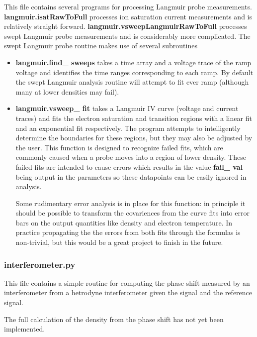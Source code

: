 \documentclass[12pt]{article}
\newcommand{\loc}[1]{{\bf \fontfamily{pcr}\selectfont #1}}
\newcommand{\todo}[1]{ \begin{tcolorbox} \centering  #1 \end{tcolorbox}}
\begin{document}
This file contains several programs for processing Langmuir probe measurements. \loc{langmuir.isatRawToFull} processes ion saturation current measurements and is relatively straight forward. \loc{langmuir.vsweepLangmuirRawToFull} processes swept Langmuir probe measurements and is considerably more complicated. The swept Langmuir probe routine makes use of several subroutines

\begin{itemize}

\item \loc{langmuir.find\_ sweeps} takes a time array and a voltage trace of the ramp voltage and identifies the time ranges corresponding to each ramp. By default the swept Langmuir analysis routine will attempt to fit ever ramp (although many at lower densities may fail). 

\item \loc{langmuir.vsweep\_ fit} takes a Langmuir IV curve (voltage and current traces) and fits the electron saturation and transition regions with a linear fit and an exponential fit respectively. The program attempts to intelligently determine the boundaries for these regions, but they may also be adjusted by the user. This function is designed to recognize failed fits, which are commonly caused when a probe moves into a region of lower density. These failed fits are intended to cause errors which results in the value \loc{fail\_ val} being output in the parameters so these datapoints can be easily ignored in analysis.

\todo{Some rudimentary error analysis is in place for this function: in principle it should be possible to transform the covariences from the curve fits into error bars on the output quantities like density and electron temperature. In practice propagating the the errors from both fits through the formulas is non-trivial, but this would be a great project to finish in the future.}

\end{itemize}


\subsubsection{\loc{interferometer.py}}

This file contains a simple routine for computing the phase shift measured by an interferometer from a hetrodyne interferometer given the signal and the reference signal. 

\todo{The full calculation of the density from the phase shift has not yet been implemented.}
\end{document}
